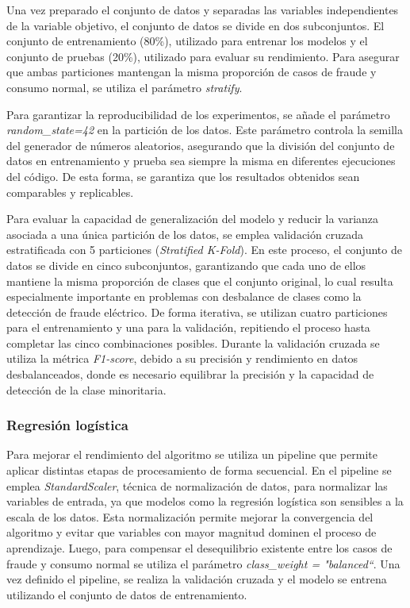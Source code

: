 \documentclass[12pt,a4paper]{report}
\begin{document}
Una vez preparado el conjunto de datos y separadas las variables independientes de la variable objetivo, el conjunto de datos se divide en dos subconjuntos. El conjunto de entrenamiento (80\%), utilizado para entrenar los modelos y el conjunto de pruebas (20\%), utilizado para evaluar su rendimiento. Para asegurar que ambas particiones mantengan la misma proporción de casos de fraude y consumo normal, se utiliza el parámetro \emph{stratify}.

Para garantizar la reproducibilidad de los experimentos, se añade el parámetro \emph{random\_state=42} en la partición de los datos. Este parámetro controla la semilla del generador de números aleatorios, asegurando que la división del conjunto de datos en entrenamiento y prueba sea siempre la misma en diferentes ejecuciones del código. De esta forma, se garantiza que los resultados obtenidos sean comparables y replicables.

Para evaluar la capacidad de generalización del modelo y reducir la varianza asociada a una única partición de los datos, se emplea validación cruzada estratificada con 5 particiones (\emph{Stratified K-Fold}). En este proceso, el conjunto de datos se divide en cinco subconjuntos, garantizando que cada uno de ellos mantiene la misma proporción de clases que el conjunto original, lo cual resulta especialmente importante en problemas con desbalance de clases como la detección de fraude eléctrico. De forma iterativa, se utilizan cuatro particiones para el entrenamiento y una para la validación, repitiendo el proceso hasta completar las cinco combinaciones posibles. Durante la validación cruzada se utiliza la métrica \emph{F1-score}, debido a su precisión y rendimiento en datos desbalanceados, donde es necesario equilibrar la precisión y la capacidad de detección de la clase minoritaria.


\subsubsection{Regresión logística}

Para mejorar el rendimiento del algoritmo se utiliza un pipeline que permite aplicar distintas etapas de procesamiento de forma secuencial. En el pipeline se emplea \emph{StandardScaler}, técnica de normalización de datos, para normalizar las variables de entrada, ya que modelos como la regresión logística son sensibles a la escala de los datos. Esta normalización permite mejorar la convergencia del algoritmo y evitar que variables con mayor magnitud dominen el proceso de aprendizaje. Luego, para compensar el desequilibrio existente entre los casos de fraude y consumo normal se utiliza el parámetro \emph{class\_weight = "balanced``}. Una vez definido el pipeline, se realiza la validación cruzada y el modelo se entrena utilizando el conjunto de datos de entrenamiento.
\end{document}

